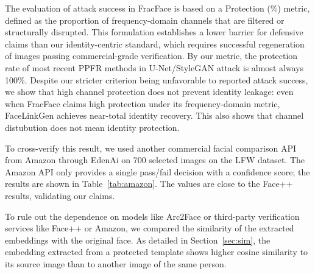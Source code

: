 The evaluation of attack success in FracFace \cite{dai_fracface_2025} is based on a Protection (\%) metric, defined as the proportion of frequency-domain channels that are filtered or structurally disrupted. This formulation establishes a lower barrier for defensive claims than our identity-centric standard, which requires successful regeneration of images passing commercial-grade verification. By our metric, the protection rate of most recent PPFR methods in U-Net/StyleGAN attack is almost always 100\%. Despite our stricter criterion being unfavorable to reported attack success, we show that high channel protection does not prevent identity leakage: even when FracFace claims high protection under its frequency-domain metric, FaceLinkGen achieves near-total identity recovery. This also shows that channel distubution does not mean identity protection. 

To cross-verify this result, we used another commercial facial comparison API from Amazon through EdenAi on 700 selected images on the LFW dataset. The Amazon API only provides a single pass/fail decision with a confidence score; the results are shown in Table~\ref{tab:amazon}. The values are close to the Face++ results, validating our claims. 

To rule out the dependence on models like Arc2Face or third-party verification services like Face++ or Amazon, we compared the similarity of the extracted embeddings with the original face. As detailed in Section~\ref{sec:sim}, the embedding extracted from a protected template shows higher cosine similarity to its source image than to another image of the same person.





